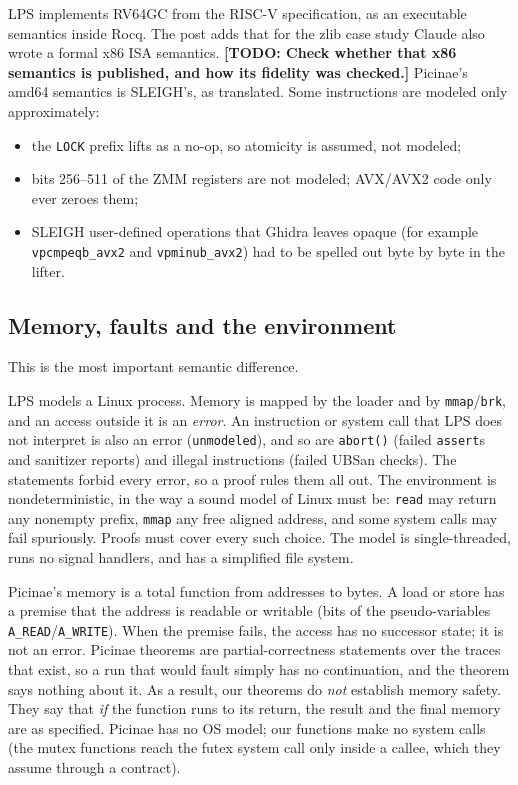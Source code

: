 \documentclass[11pt]{article}
\newcommand{\todo}[1]{\textbf{[TODO: #1]}}
\newcommand{\code}[1]{\texttt{#1}}
\begin{document}
LPS implements RV64GC from the RISC-V specification, as an executable
semantics inside Rocq.  The post adds that for the zlib case study Claude
also wrote a formal x86 ISA semantics.  \todo{Check whether that x86
semantics is published, and how its fidelity was checked.}  Picinae's amd64
semantics is SLEIGH's, as translated.  Some instructions are modeled only
approximately:
\begin{itemize}[nosep]
\item the \code{LOCK} prefix lifts as a no-op, so atomicity is assumed, not
      modeled;
\item bits 256--511 of the ZMM registers are not modeled; AVX/AVX2 code
      only ever zeroes them;
\item SLEIGH user-defined operations that Ghidra leaves opaque (for example
      \code{vpcmpeqb\_avx2} and \code{vpminub\_avx2}) had to be spelled out
      byte by byte in the lifter.
\end{itemize}

\subsection{Memory, faults and the environment}

This is the most important semantic difference.

LPS models a Linux process.  Memory is mapped by the loader and by
\code{mmap}/\code{brk}, and an access outside it is an \emph{error}.  An
instruction or system call that LPS does not interpret is also an error
(\code{unmodeled}), and so are \code{abort()} (failed \code{assert}s and
sanitizer reports) and illegal instructions (failed UBSan checks).  The
statements forbid every error, so a proof rules them all out.  The
environment is nondeterministic, in the way a sound model of Linux must be:
\code{read} may return any nonempty prefix, \code{mmap} any free aligned
address, and some system calls may fail spuriously.  Proofs must cover every
such choice.  The model is single-threaded, runs no signal handlers, and has
a simplified file system.

Picinae's memory is a total function from addresses to bytes.  A load or
store has a premise that the address is readable or writable (bits of the
pseudo-variables \code{A\_READ}/\code{A\_WRITE}).  When the premise fails,
the access has no successor state; it is not an error.  Picinae theorems are
partial-correctness statements over the traces that exist, so a run that
would fault simply has no continuation, and the theorem says nothing about
it.  As a result, our theorems do \emph{not} establish memory safety.  They
say that \emph{if} the function runs to its return, the result and the final
memory are as specified.  Picinae has no OS model; our functions make no
system calls (the mutex functions reach the futex system call only inside a
callee, which they assume through a contract).
\end{document}
